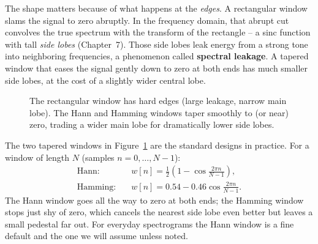 The shape matters because of what happens at the \emph{edges}. A rectangular
window slams the signal to zero abruptly. In the frequency domain, that abrupt
cut convolves the true spectrum with the transform of the rectangle -- a sinc
function with tall \emph{side lobes} (Chapter~7). Those side lobes leak energy
from a strong tone into neighboring frequencies, a phenomenon called
\textbf{spectral leakage}. A tapered window that eases the signal gently down to
zero at both ends has much smaller side lobes, at the cost of a slightly wider
central lobe.

\begin{figure}[H]
\centering
{}
\caption{The rectangular window has hard edges (large leakage, narrow main lobe).
The Hann and Hamming windows taper smoothly to (or near) zero, trading a wider
main lobe for dramatically lower side lobes.}
\label{ch10:fig-windows}
\end{figure}

The two tapered windows in Figure~\ref{ch10:fig-windows} are the standard designs in practice. For a
window of length $N$ (samples $n = 0,\dots,N-1$):
\begin{align}
\text{Hann:}\quad & w[n] = \tfrac12\!\left(1 - \cos\tfrac{2\pi n}{N-1}\right), \label{ch10:hann}\\
\text{Hamming:}\quad & w[n] = 0.54 - 0.46\cos\tfrac{2\pi n}{N-1}. \label{ch10:hamming}
\end{align}
The Hann window goes all the way to zero at both ends; the Hamming window stops
just shy of zero, which cancels the nearest side lobe even better but leaves a
small pedestal far out. For everyday spectrograms the Hann window is a fine
default and the one we will assume unless noted.

